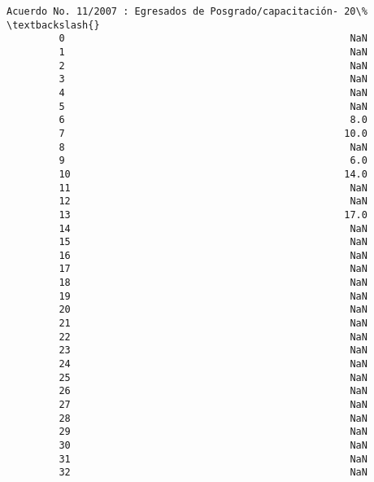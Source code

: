 \documentclass[11pt]{article}
\begin{document}
\begin{Verbatim}[commandchars=\\\{\}]
             Acuerdo No. 11/2007 : Egresados de Posgrado/capacitación- 20\%  \textbackslash{}
         0                                                 NaN               
         1                                                 NaN               
         2                                                 NaN               
         3                                                 NaN               
         4                                                 NaN               
         5                                                 NaN               
         6                                                 8.0               
         7                                                10.0               
         8                                                 NaN               
         9                                                 6.0               
         10                                               14.0               
         11                                                NaN               
         12                                                NaN               
         13                                               17.0               
         14                                                NaN               
         15                                                NaN               
         16                                                NaN               
         17                                                NaN               
         18                                                NaN               
         19                                                NaN               
         20                                                NaN               
         21                                                NaN               
         22                                                NaN               
         23                                                NaN               
         24                                                NaN               
         25                                                NaN               
         26                                                NaN               
         27                                                NaN               
         28                                                NaN               
         29                                                NaN               
         30                                                NaN               
         31                                                NaN               
         32                                                NaN               

\end{Verbatim}
\end{document}
